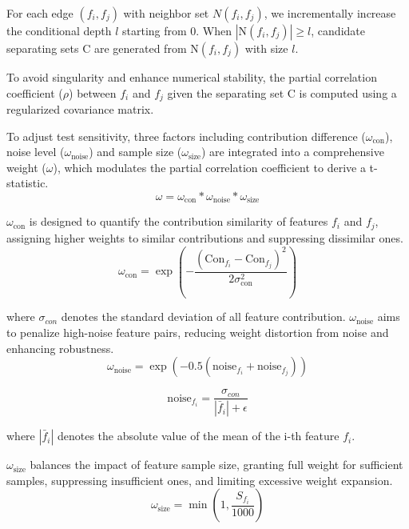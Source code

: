 \documentclass[journal]{IEEEtran}
\begin{document}
For each edge \((f_i, f_j)\) with neighbor set $N(f_i, f_j)$, we incrementally increase the conditional depth $l$ starting from 0. When $|\text{N}(f_i, f_j)| \geq l$, candidate separating sets $\text{C}$ are generated from \(\text{N}(f_i, f_j)\) with size $l$. 

To avoid singularity and enhance numerical stability, the partial correlation coefficient ($\rho$)\cite{kendall1948corr} between $f_i$ and $f_j$ given the separating set $\text{C}$ is computed using a regularized covariance matrix.

To adjust test sensitivity, three factors including contribution difference ($\omega_{\text{con}}$), noise level ($\omega_{\text{noise}}$) and sample size ($\omega_{\text{size}}$) are integrated into a comprehensive weight ($\omega$), which modulates the partial correlation coefficient to derive a t-statistic.
\begin{equation}
    \omega = \omega_{\text{con}} * \omega_{\text{noise}} * \omega_{\text{size}} 
\end{equation}

\(\omega_{\text{con}}\) is designed to quantify the contribution similarity of features \(f_i\) and \(f_j\), assigning higher weights to similar contributions and suppressing dissimilar ones.
\begin{equation}
\omega_{\text{con}} = \exp\left( -\frac{(\text{Con}_{f_i} - \text{Con}_{f_j})^2}{2\sigma_{\text{con}}^2} \right) \label{eq:weight_con} 
\end{equation}

where  \(\sigma_{con}\) denotes the standard deviation of all feature contribution.
\(\omega_{\text{noise}}\) aims to penalize high-noise feature pairs, reducing weight distortion from noise and enhancing robustness.
\begin{equation}
\omega_{\text{noise}} = \exp \left( -0.5(\text{noise}_{f_i} + \text{noise}_{f_j}) \right) \label{eq:weight_noise}
\end{equation}

\begin{equation}
\text{noise}_{f_i} = \frac{\sigma_{con}}{|\bar{f}_i| + \epsilon}
\end{equation}

where $|\bar{f}_i|$ denotes the absolute value of the mean of the i-th feature \(f_i\).

$\omega_{\text{size}}$ balances the impact of feature sample size, granting full weight for sufficient samples, suppressing insufficient ones, and limiting excessive weight expansion.
\begin{equation}
\omega_{\text{size}} = \min\left( 1, \frac{S_{f_i}}{1000} \right)
\end{equation}
\end{document}
